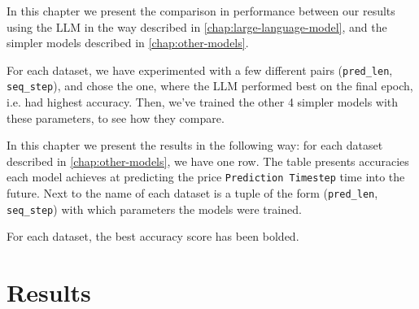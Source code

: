 In this chapter we present the comparison in performance between our results using the LLM in the way described in \autoref{chap:large-language-model}, and the simpler models described in \autoref{chap:other-models}.

For each dataset, we have experimented with a few different pairs (\verb|pred_len|, \verb|seq_step|), and chose the one, where the LLM performed best on the final epoch, i.e. had highest accuracy. Then, we've trained the other 4 simpler models with these parameters, to see how they compare.

In this chapter we present the results in the following way: for each dataset described in \autoref{chap:other-models}, we have one row. The table presents accuracies each model achieves at predicting the price \verb|Prediction Timestep| time into the future. Next to the name of each dataset is a tuple of the form (\verb|pred_len|, \verb|seq_step|) with which parameters the models were trained.

For each dataset, the best accuracy score has been bolded.

\section{Results}


